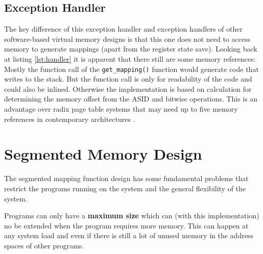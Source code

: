 \subsection{Exception Handler} The key difference of this exception handler and exception handlers
of other software-based virtual memory designs is that this one does not need to access
memory to generate mappings (apart from the register state save).
Looking back at listing \ref{lst:handler} it is apparent that there still are some
memory references:
Mostly the function call of the \texttt{get\_mapping()} function would generate code that
writes to the stack. But the function call is only for readability of the code and could also
be inlined.
Otherwise the implementation is based on calculation for determining the memory offset from
the ASID and bitwise operations.
This is an advantage over radix page table systems that may need up to five memory references
in contemporary architectures \cite{intel5LevelPaging5Level2017}.

\section{Segmented Memory Design}
The segmented mapping function design has some fundamental problems that restrict the programs running on the system and the general flexibility of the system.

Programs can only have a \textbf{maximum size} which can (with this implementation) no be extended when the program requires more memory. This can happen at any system load and even if there is still a lot of unused memory in the address spaces of other programs.

